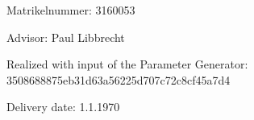 \begin{large} 
\begin{center}
Matrikelnummer: 3160053
\end{center}
\end{large} 

\vspace*{-0mm}




\begin{large} 
\begin{center}
Advisor: Paul Libbrecht
\end{center}
\end{large} 

\begin{large} 
\begin{center}
Realized with input of the Parameter Generator: \\3508688875eb31d63a56225d707c72c8cf45a7d4 
\end{center}
\end{large} 





\vspace*{-6mm}

\begin{large} 
\begin{center}
Delivery date: 1.1.1970
\end{center}
\end{large} 


\pagestyle{empty} %